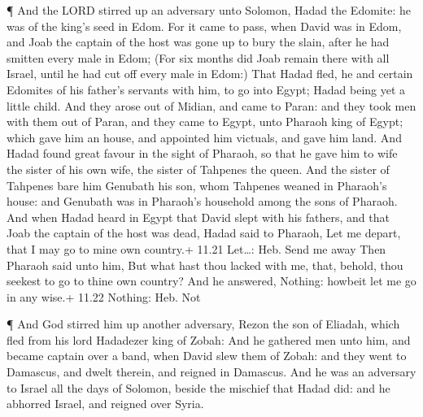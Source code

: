  ¶ And the LORD stirred up an adversary unto Solomon, Hadad
the Edomite: he was of the king's seed in Edom.  For it
came to pass, when David was in Edom, and Joab the captain of the host
was gone up to bury the slain, after he had smitten every male in Edom;
 (For six months did Joab remain there with all Israel,
until he had cut off every male in Edom:)  That Hadad fled,
he and certain Edomites of his father's servants with him, to go into
Egypt; Hadad being yet a little child.  And they arose out
of Midian, and came to Paran: and they took men with them out of Paran,
and they came to Egypt, unto Pharaoh king of Egypt; which gave him an
house, and appointed him victuals, and gave him land.  And
Hadad found great favour in the sight of Pharaoh, so that he gave him to
wife the sister of his own wife, the sister of Tahpenes the queen.
 And the sister of Tahpenes bare him Genubath his son, whom
Tahpenes weaned in Pharaoh's house: and Genubath was in Pharaoh's
household among the sons of Pharaoh.  And when Hadad heard
in Egypt that David slept with his fathers, and that Joab the captain of
the host was dead, Hadad said to Pharaoh, Let me depart, that I may go
to mine own country.+ 11.21 Let\ldots: Heb. Send me away 
Then Pharaoh said unto him, But what hast thou lacked with me, that,
behold, thou seekest to go to thine own country? And he answered,
Nothing: howbeit let me go in any wise.+ 11.22 Nothing: Heb. Not

 ¶ And God stirred him up another adversary, Rezon the son
of Eliadah, which fled from his lord Hadadezer king of Zobah:
 And he gathered men unto him, and became captain over a
band, when David slew them of Zobah: and they went to Damascus, and
dwelt therein, and reigned in Damascus.  And he was an
adversary to Israel all the days of Solomon, beside the mischief that
Hadad did: and he abhorred Israel, and reigned over Syria.

